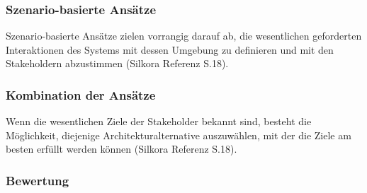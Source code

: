 \subsubsection{Szenario-basierte Ansätze}
Szenario-basierte Ansätze zielen vorrangig darauf ab, die wesentlichen geforderten Interaktionen des Systems mit dessen Umgebung zu definieren und mit den Stakeholdern abzustimmen (Silkora Referenz S.18).
\subsubsection{Kombination der Ansätze}
Wenn die wesentlichen Ziele der Stakeholder bekannt sind, besteht die Möglichkeit, diejenige Architekturalternative auszuwählen, mit der die Ziele am besten erfüllt werden können (Silkora Referenz S.18).
\subsubsection{Bewertung}

